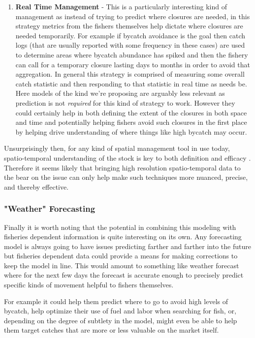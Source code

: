 \documentclass[11pt]{article}
\begin{document}
\begin{enumerate}
\item \textbf{Real Time Management} - This is a particularly interesting kind of management as instead of trying to predict where closures are needed, in this strategy metrics from the fishers themselves help dictate where closures are needed temporarily. For example if bycatch avoidance is the goal then catch logs (that are usually reported with some frequency in these cases) are used to determine areas where bycatch abundance has spiked and then the fishery can call for a temporary closure lasting days to months in order to avoid that aggregation. In general this strategy is comprised of measuring some overall catch statistic and then responding to that statistic in real time as needs be. Here models of the kind we're proposing are arguably less relevant as prediction is not \textit{required} for this kind of strategy to work. However they could certainly help in both defining the extent of the closures in both space and time and potentially helping fishers avoid such closures in the first place by helping drive understanding of where things like high bycatch may occur. 
\end{enumerate}

Unsurprisingly then, for any kind of spatial management tool in use today, spatio-temporal understanding of the stock is key to both definition and efficacy \cite{selig2016} \cite{little2014}. Therefore it seems likely that bringing high resolution spatio-temporal data to the bear on the issue can only help make such techniques more nuanced, precise, and thereby effective. 

\subsubsection{"Weather" Forecasting}

Finally it is worth noting that the potential in combining this modeling with fisheries dependent information is quite interesting on its own. Any forecasting model is always going to have issues predicting farther and farther into the future but fisheries dependent data could provide a means for making corrections to keep the model in line. This would amount to something like weather forecast where for the next few days the forecast is accurate enough to precisely predict specific kinds of movement helpful to fishers themselves. 

For example it could help them predict where to go to avoid high levels of bycatch, help optimize their use of fuel and labor when searching for fish, or, depending on the degree of subtlety in the model, might even be able to help them target catches that are more or less valuable on the market itself. 
\end{document}
